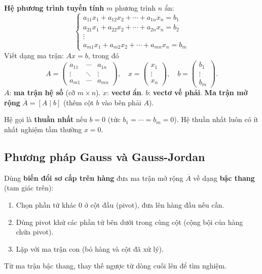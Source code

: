 \documentclass[12pt,a4paper]{article}
\begin{document}
\begin{dinhnghia}
  \textbf{Hệ phương trình tuyến tính} $m$ phương trình $n$ ẩn:
  \[
    \begin{cases}
      a_{11}x_1 + a_{12}x_2 + \cdots + a_{1n}x_n = b_1 \\
      a_{21}x_1 + a_{22}x_2 + \cdots + a_{2n}x_n = b_2 \\
      \vdots \\
      a_{m1}x_1 + a_{m2}x_2 + \cdots + a_{mn}x_n = b_m
    \end{cases}
  \]
  Viết dạng ma trận: $Ax = b$, trong đó
  \[
    A = \begin{pmatrix} a_{11} & \cdots & a_{1n} \\ \vdots & \ddots & \vdots \\ a_{m1} & \cdots & a_{mn} \end{pmatrix},\quad
    x = \begin{pmatrix} x_1 \\ \vdots \\ x_n \end{pmatrix},\quad
    b = \begin{pmatrix} b_1 \\ \vdots \\ b_m \end{pmatrix}.
  \]
  $A$: \textbf{ma trận hệ số} (cỡ $m \times n$). $x$: \textbf{vectơ ẩn}. $b$: \textbf{vectơ vế phải}. \textbf{Ma trận mở rộng} $\overline{A} = [A \mid b]$ (thêm cột $b$ vào bên phải $A$).
\end{dinhnghia}

\begin{dinhnghia}
  Hệ gọi là \textbf{thuần nhất} nếu $b = 0$ (tức $b_1 = \cdots = b_m = 0$). Hệ thuần nhất luôn có ít nhất nghiệm tầm thường $x = 0$.
\end{dinhnghia}

\subsection{Phương pháp Gauss và Gauss-Jordan}

\begin{phuongphap}[title={Phương pháp Gauss}]
  Dùng \textbf{biến đổi sơ cấp trên hàng} đưa ma trận mở rộng $\overline{A}$ về dạng \textbf{bậc thang} (tam giác trên):
  \begin{enumerate}
    \item Chọn phần tử khác 0 ở cột đầu (pivot), đưa lên hàng đầu nếu cần.
    \item Dùng pivot khử các phần tử bên dưới trong cùng cột (cộng bội của hàng chứa pivot).
    \item Lặp với ma trận con (bỏ hàng và cột đã xử lý).
  \end{enumerate}
  Từ ma trận bậc thang, thay thế ngược từ dòng cuối lên để tìm nghiệm.
\end{phuongphap}
\end{document}
